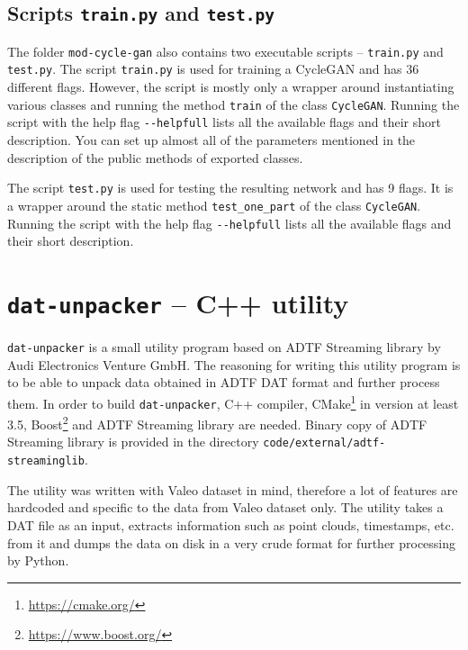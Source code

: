 \subsection{Scripts \texttt{train.py} and \texttt{test.py}} \label{trainpy}

The folder \texttt{mod-cycle-gan} also contains two executable scripts -- \texttt{train.py} and \texttt{test.py}. The script \texttt{train.py} is used for training a CycleGAN and has 36 different flags. However, the script is mostly only a wrapper around instantiating various classes and running the method \texttt{train} of the class \texttt{CycleGAN}. Running the script with the help flag \texttt{-{}-helpfull} lists all the available flags and their short description. You can set up almost all of the parameters mentioned in the description of the public methods of exported classes.

The script \texttt{test.py} is used for testing the resulting network and has 9 flags. It is a wrapper around the static method \texttt{test\_one\_part} of the class \texttt{CycleGAN}. Running the script with the help flag \texttt{-{}-helpfull} lists all the available flags and their short description.

\section[\texttt{dat-unpacker}]{\texttt{dat-unpacker} -- C++ utility}

\texttt{dat-unpacker} is a small utility program based on ADTF Streaming library by Audi Electronics Venture GmbH. The reasoning for writing this utility program is to be able to unpack data obtained in ADTF DAT format and further process them. In order to build \texttt{dat-unpacker}, C+{}+ compiler, CMake\footnote{\url{https://cmake.org/}} in version at least 3.5, Boost\footnote{\url{https://www.boost.org/}} and ADTF Streaming library are needed. Binary copy of ADTF Streaming library is provided in the directory \texttt{code/external/adtf-streaminglib}.

The utility was written with Valeo dataset in mind, therefore a lot of features are hardcoded and specific to the data from Valeo dataset only. The utility takes a DAT file as an input, extracts information such as point clouds, timestamps, etc. from it and dumps the data on disk in a very crude format for further processing by Python.

